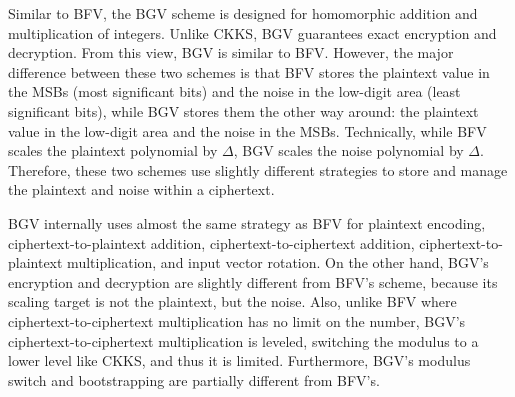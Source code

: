 
Similar to BFV, the BGV scheme is designed for homomorphic addition and multiplication of integers. Unlike CKKS, BGV guarantees exact encryption and decryption. From this view, BGV is similar to BFV. However, the major difference between these two schemes is that BFV stores the plaintext value in the MSBs (most significant bits) and the noise in the low-digit area (least significant bits), while BGV stores them the other way around: the plaintext value in the low-digit area and the noise in the MSBs. Technically, while BFV scales the plaintext polynomial by $\Delta$, BGV scales the noise polynomial by $\Delta$. Therefore, these two schemes use slightly different strategies to store and manage the plaintext and noise within a ciphertext. 

BGV internally uses almost the same strategy as BFV for plaintext encoding, ciphertext-to-plaintext addition, ciphertext-to-ciphertext addition, ciphertext-to-plaintext multiplication, and input vector rotation. On the other hand, BGV's encryption and decryption are slightly different from BFV's scheme, because its scaling target is not the plaintext, but the noise. Also, unlike BFV where ciphertext-to-ciphertext multiplication has no limit on the number, BGV's ciphertext-to-ciphertext multiplication is leveled, switching the modulus to a lower level like CKKS, and thus it is limited. Furthermore, BGV's modulus switch and bootstrapping are partially different from BFV's. 




